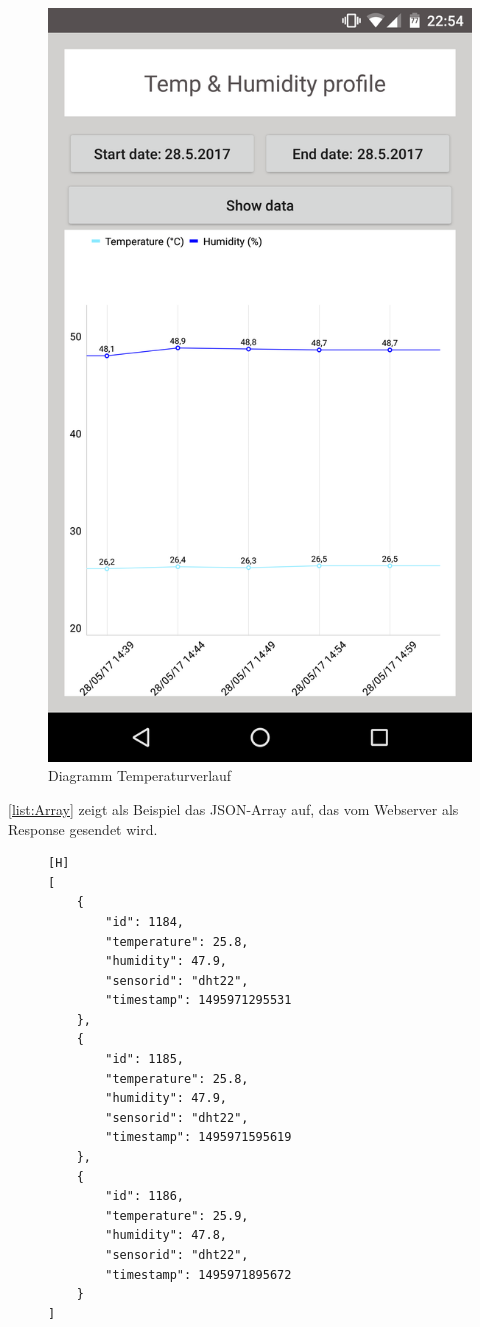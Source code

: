 \begin{figure}[H]
	\centering
	\includegraphics[scale=0.1]{images/appVerlauf}
	\caption{Diagramm Temperaturverlauf}
	\label{fig:temVerlauf}
\end{figure}

\autoref{list:Array} zeigt als Beispiel das \ac{JSON}-Array auf, das vom Webserver als Response gesendet wird. 
\begin{figure}


\begin{lstlisting}[label=list:Array, caption={Beispiel: JSON Array}][H]
[
	{
		"id": 1184,
		"temperature": 25.8,
		"humidity": 47.9,
		"sensorid": "dht22",
		"timestamp": 1495971295531
	},
	{
		"id": 1185,
		"temperature": 25.8,
		"humidity": 47.9,
		"sensorid": "dht22",
		"timestamp": 1495971595619
	},
	{
		"id": 1186,
		"temperature": 25.9,
		"humidity": 47.8,
		"sensorid": "dht22",
		"timestamp": 1495971895672
	}
]
\end{lstlisting}
\end{figure}

